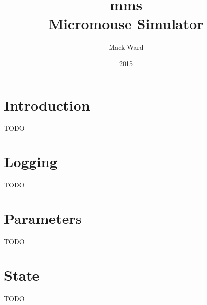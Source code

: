 \documentclass[12pt]{article}
\begin{document}
\renewcommand{\l}{\left(}
\renewcommand{\r}{\right)}

\title{\vspace{60mm}\textbf{mms}\\Micromouse Simulator}
\author{Mack Ward}
\date{2015}
\maketitle

\newpage
\renewcommand*\contentsname{Table of Contents}
\tableofcontents

\newpage
\section{Introduction}
TODO

\section{Logging}
TODO

\section{Parameters}
TODO

\section{State}
TODO
\end{document}
